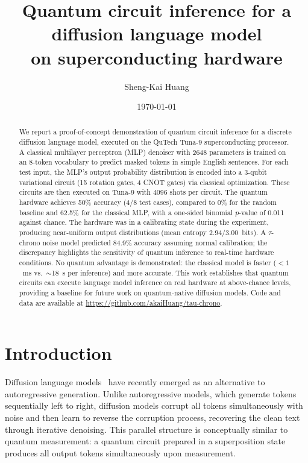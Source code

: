 \documentclass[prl,twocolumn,superscriptaddress,longbibliography,floatfix]{revtex4-2}
\begin{document}
\title{Quantum circuit inference for a diffusion language model\\ on superconducting hardware}

\author{Sheng-Kai Huang}

\date{\today}

\begin{abstract}
We report a proof-of-concept demonstration of quantum circuit inference for a discrete diffusion language model, executed on the QuTech Tuna-9 superconducting processor. A classical multilayer perceptron (MLP) denoiser with 2648 parameters is trained on an 8-token vocabulary to predict masked tokens in simple English sentences. For each test input, the MLP's output probability distribution is encoded into a 3-qubit variational circuit (15 rotation gates, 4 CNOT gates) via classical optimization. These circuits are then executed on Tuna-9 with 4096 shots per circuit. The quantum hardware achieves 50\% accuracy (4/8 test cases), compared to 0\% for the random baseline and 62.5\% for the classical MLP, with a one-sided binomial $p$-value of 0.011 against chance. The hardware was in a calibrating state during the experiment, producing near-uniform output distributions (mean entropy $2.94/3.00$~bits). A $\tau$-chrono noise model predicted 84.9\% accuracy assuming normal calibration; the discrepancy highlights the sensitivity of quantum inference to real-time hardware conditions. No quantum advantage is demonstrated: the classical model is faster ($< 1$~ms vs.\ $\sim$18~s per inference) and more accurate. This work establishes that quantum circuits can execute language model inference on real hardware at above-chance levels, providing a baseline for future work on quantum-native diffusion models. Code and data are available at \url{https://github.com/akaiHuang/tau-chrono}.
\end{abstract}

\maketitle

\section{Introduction}

Diffusion language models~\cite{MDLM2024,SEDD2024} have recently emerged as an alternative to autoregressive generation. Unlike autoregressive models, which generate tokens sequentially left to right, diffusion models corrupt all tokens simultaneously with noise and then learn to reverse the corruption process, recovering the clean text through iterative denoising. This parallel structure is conceptually similar to quantum measurement: a quantum circuit prepared in a superposition state produces all output tokens simultaneously upon measurement.
\end{document}
